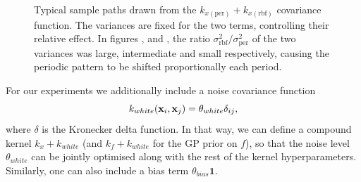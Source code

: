 \begin{figure}[ht]
\begin{center}
\end{center}
\caption{
  \small{
    Typical sample paths drawn from the $k_{x(\text{per})} + k_{x(\text{rbf})}$ covariance function.
    The variances are fixed for the two terms,
    controlling their relative effect. In figures ,  and ,
    the ratio $\sigma_{\text{rbf}}^2 / \sigma_{\text{per}}^2$ of the two variances was large, intermediate and small respectively,
    causing the periodic pattern to be shifted proportionally each period.
  }
}
\label{fig:rbfPeriodic}
\end{figure}

\par For our experiments we additionally include a noise covariance function 
\begin{equation}
\label{whiteNoise}
k_{white}(\mathbf{x}_i, \mathbf{x}_j) = \theta_{white} \delta_{ij},
\end{equation}
where $\delta$ is the Kronecker delta function. In that way, we can define a compound 
kernel $k_x + k_{white}$ (and $k_f + k_{white}$ for the GP prior on $f$), so that
the noise level $\theta_{white}$ can be jointly optimised along with the rest of the kernel hyperparameters. Similarly,
one can also include a bias term $\theta_{bias} \mathbf{1}$. %

